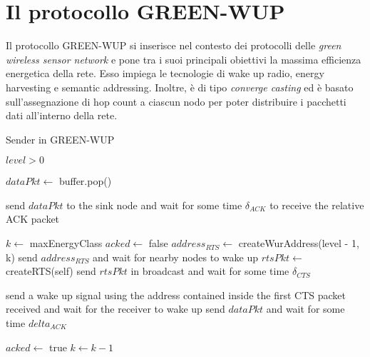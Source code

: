 \documentclass[binding=0.6cm,TFA]{sapthesis}
\begin{document}
\chapter{Il protocollo GREEN-WUP}

Il protocollo GREEN-WUP si inserisce nel contesto dei protocolli delle \emph{green wireless sensor network} e pone tra i suoi principali obiettivi
la massima efficienza energetica della rete. Esso impiega le tecnologie di wake up radio, energy harvesting e semantic addressing. Inoltre, è
di tipo \emph{converge casting} ed è basato sull'assegnazione di hop count a ciascun nodo per poter distribuire i pacchetti dati
all'interno della rete.\\

\begin{algorithm}
    \caption{Sender in GREEN-WUP}
    \begin{algorithmic}
        \REQUIRE $level > 0$

            \STATE $dataPkt \leftarrow$ buffer.pop()

                \STATE send $dataPkt$ to the sink node and wait for some time $\delta_{ACK}$ to receive the relative ACK packet

            \ELSE
                \STATE $k \leftarrow$ maxEnergyClass
                \STATE $acked \leftarrow$ false
                    \STATE $address_{RTS} \leftarrow$ createWurAddress(level - 1, k)
                    \STATE send $address_{RTS}$ and wait for nearby nodes to wake up
                    \STATE $rtsPkt \leftarrow$ createRTS(self)
                    \STATE send $rtsPkt$ in broadcast and wait for some time $\delta_{CTS}$
                    
                        \STATE send a wake up signal using the address contained inside the first CTS packet received and wait for the receiver to wake up
                        \STATE send $dataPkt$ and wait for some time $delta_{ACK}$

                            \STATE $acked \leftarrow$ true
                        \ENDIF
                    \ENDIF
                    \STATE $k \leftarrow k-1$
                \ENDWHILE
            \ENDIF
        
        \ENDWHILE
    \end{algorithmic}
\end{algorithm}
\end{document}
